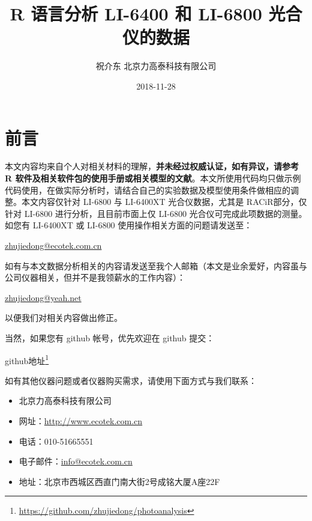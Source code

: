 \documentclass[]{krantz}
\title{R 语言分析 LI-6400 和 LI-6800 光合仪的数据}
\author{祝介东 北京力高泰科技有限公司}
\date{2018-11-28}
\renewcommand{\href}[2]{#2\footnote{\url{#1}}}
\theoremstyle{definition}
\theoremstyle{definition}
\theoremstyle{definition}
\theoremstyle{remark}
\begin{document}
\maketitle



\thispagestyle{empty}

\setlength{\abovedisplayskip}{-5pt}
\setlength{\abovedisplayshortskip}{-5pt}

{
\hypersetup{linkcolor=black}
\setcounter{tocdepth}{2}
\tableofcontents
}
\listoftables
\listoffigures
\frontmatter

\chapter*{前言}\label{frontmatter}


本文内容均来自个人对相关材料的理解，\textbf{并未经过权威认证，如有异议，请参考
R
软件及相关软件包的使用手册或相关模型的文献}。本文所使用代码均只做示例代码使用，在做实际分析时，请结合自己的实验数据及模型使用条件做相应的调整。本文内容仅针对
LI-6800 与 LI-6400XT 光合仪数据，尤其是 RACiR\texttrademark 部分，仅针对
LI-6800 进行分析，且目前市面上仅 LI-6800
光合仪可完成此项数据的测量。如您有 LI-6400XT 或 LI-6800
使用操作相关方面的问题请发送至：

\url{zhujiedong@ecotek.com.cn}

如有与本文数据分析相关的内容请发送至我个人邮箱（本文是业余爱好，内容虽与公司仪器相关，但并不是我领薪水的工作内容）：

\url{zhujiedong@yeah.net}

以便我们对相关内容做出修正。

当然，如果您有 github 帐号，优先欢迎在 github 提交：

\href{https://github.com/zhujiedong/photoanalysis}{github地址}

如有其他仪器问题或者仪器购买需求，请使用下面方式与我们联系：

\begin{itemize}
\item
  北京力高泰科技有限公司
\item
  网址：\url{http://www.ecotek.com.cn}
\item
  电话：010-51665551
\item
  电子邮件：\url{info@ecotek.com.cn}
\item
  地址：北京市西城区西直门南大街2号成铭大厦A座22F
\end{itemize}
\end{document}
